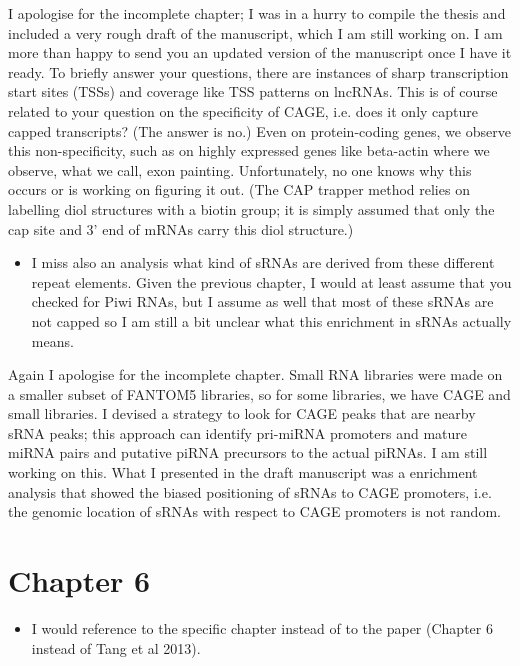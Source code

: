 \documentclass[10pt,a4paper,sans]{article}
\begin{document}
\noindent
I apologise for the incomplete chapter; I was in a hurry to compile the thesis and included a very rough draft of the manuscript, which I am still working on. I am more than happy to send you an updated version of the manuscript once I have it ready. To briefly answer your questions, there are instances of sharp transcription start sites (TSSs) and coverage like TSS patterns on lncRNAs. This is of course related to your question on the specificity of CAGE, i.e. does it only capture capped transcripts? (The answer is no.) Even on protein-coding genes, we observe this non-specificity, such as on highly expressed genes like beta-actin where we observe, what we call, exon painting. Unfortunately, no one knows why this occurs or is working on figuring it out. (The CAP trapper method relies on labelling diol structures with a biotin group; it is simply assumed that only the cap site and 3' end of mRNAs carry this diol structure.)

\begin{itemize}
   \item{I miss also an analysis what kind of sRNAs are derived from these different repeat elements. Given the previous chapter, I would at least assume that you checked for Piwi RNAs, but I assume as well that most of these sRNAs are not capped so I am still a bit unclear what this enrichment in sRNAs actually means.}
\end{itemize}

\noindent
Again I apologise for the incomplete chapter. Small RNA libraries were made on a smaller subset of FANTOM5 libraries, so for some libraries, we have CAGE and small libraries. I devised a strategy to look for CAGE peaks that are nearby sRNA peaks; this approach can identify pri-miRNA promoters and mature miRNA pairs and putative piRNA precursors to the actual piRNAs. I am still working on this. What I presented in the draft manuscript was a enrichment analysis that showed the biased positioning of sRNAs to CAGE promoters, i.e. the genomic location of sRNAs with respect to CAGE promoters is not random.

\noindent

\section{Chapter 6}

\begin{itemize}
   \item{I would reference to the specific chapter instead of to the paper (Chapter 6 instead of Tang et al 2013).}
\end{itemize}
\end{document}
